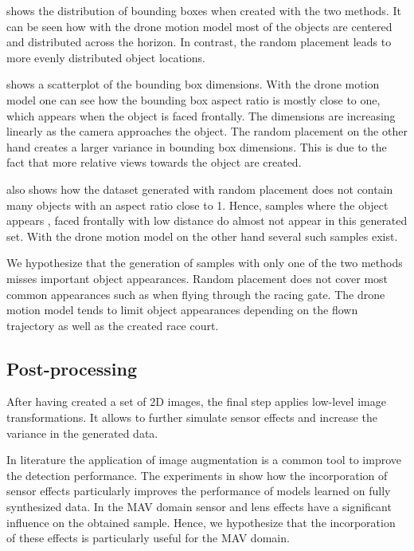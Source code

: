  shows the distribution of bounding boxes when created with the two methods. It can be seen how with the drone motion model most of the objects are centered and distributed across the horizon. In contrast, the random placement leads to more evenly distributed object locations.

 shows a scatterplot of the bounding box dimensions. With the drone motion model one can see how the bounding box aspect ratio is mostly close to one, which appears when the object is faced frontally. The dimensions are increasing linearly as the camera approaches the object. The random placement on the other hand creates a larger variance in bounding box dimensions. This is due to the fact that more relative views towards the object are created. 

 also shows how the dataset generated with random placement does not contain many objects with an aspect ratio close to 1. Hence, samples where the object appears , faced frontally with low distance do almost not appear in this generated set. With the drone motion model on the other hand several such samples exist.

We hypothesize that the generation of samples with only one of the two methods misses important object appearances. Random placement does not cover most common appearances such as when flying through the racing gate. The drone motion model tends to limit object appearances depending on the flown trajectory as well as the created race court.


\subsection{Post-processing}

After having created a set of 2D images, the final step applies low-level image transformations. It allows to further simulate sensor effects and increase the variance in the generated data.

In literature \cite{Krizhevsky2012a,Howard2013,Redmon,Liu} the application of image augmentation is a common tool to improve the detection performance. The experiments in \cite{Carlson2018} show how the incorporation of sensor effects particularly improves the performance of models learned on fully synthesized data. In the \ac{MAV} domain sensor and lens effects have a significant influence on the obtained sample. Hence, we hypothesize that the incorporation of these effects is particularly useful for the \ac{MAV} domain.

